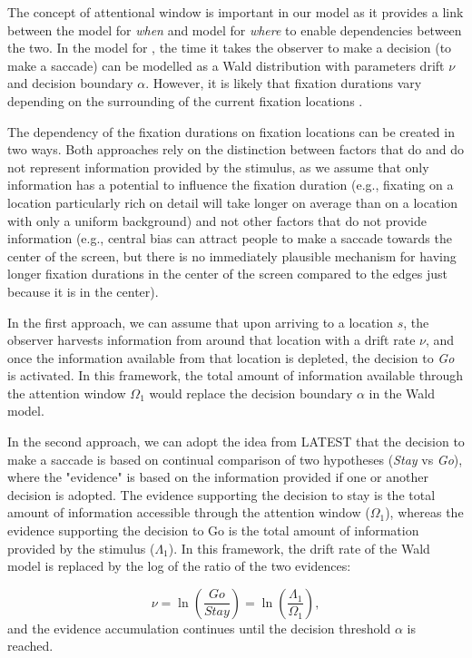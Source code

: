 \documentclass{article}
\begin{document}
The concept of attentional window is important in our model as it provides a link between the model for \textit{when} and model for \textit{where} to enable dependencies between the two. In the model for , the time it takes the observer to make a decision (to make a saccade) can be modelled as a Wald distribution with parameters drift $\nu$ and decision boundary $\alpha$. However, it is likely that fixation durations vary depending on the surrounding of the current fixation locations \citep{nuthmann2010crisp,nuthmann2017fixation_durations}. 

The dependency of the fixation durations on fixation locations can be created in two ways. Both approaches rely on the distinction between factors that do and do not represent information provided by the stimulus, as we assume that only information has a potential to influence the fixation duration (e.g., fixating on a location particularly rich on detail will take longer on average than on a location with only a uniform background) and not other factors that do not provide information (e.g., central bias can attract people to make a saccade towards the center of the screen, but there is no immediately plausible mechanism for having longer fixation durations in the center of the screen compared to the edges just because it is in the center).

In the first approach, we can assume that upon arriving to a location $s$, the observer harvests information from around that location with a drift rate $\nu$, and once the information available from that location is depleted, the decision to \textit{Go} is activated. In this framework, the total amount of information available through the attention window $\Omega_1$ would replace the decision boundary $\alpha$ in the Wald model.

In the second approach, we can adopt the idea from LATEST \citep{tatler2017latest} that the decision to make a saccade is based on continual comparison of two hypotheses (\textit{Stay} vs \textit{Go}), where the "evidence" is based on the information provided if one or another decision is adopted. The evidence supporting the decision to stay is the total amount of information accessible through the attention window ($\Omega_1$), whereas the evidence supporting the decision to Go is the total amount of information provided by the stimulus ($\Lambda_1$). In this framework, the drift rate of the Wald model is replaced by the log of the ratio of the two evidences:

$$\nu = \ln\left(\frac{Go}{Stay}\right) = \ln\left(\frac{\Lambda_1}{\Omega_1}\right),$$
and the evidence accumulation continues until the decision threshold $\alpha$ is reached.
\end{document}
